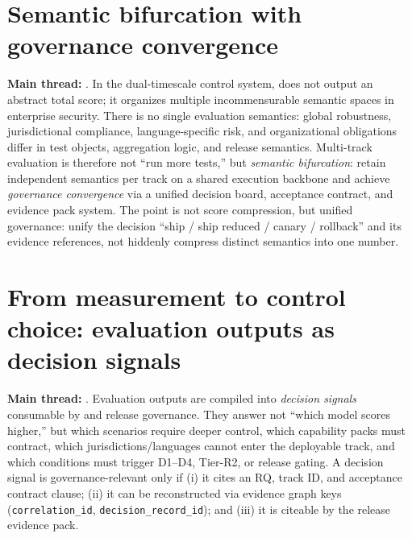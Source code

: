 \documentclass[11pt,a4paper]{report}
\begin{document}
\section{Semantic bifurcation with governance convergence}
\textbf{Main thread:} \EvalFramework{}. In the dual-timescale control system, \EvalFramework{} does not output an abstract total score; it organizes multiple incommensurable semantic spaces in enterprise security. There is no single evaluation semantics: global robustness, jurisdictional compliance, language-specific risk, and organizational obligations differ in test objects, aggregation logic, and release semantics. Multi-track evaluation is therefore not “run more tests,” but \emph{semantic bifurcation}: retain independent semantics per track on a shared execution backbone and achieve \emph{governance convergence} via a unified decision board, acceptance contract, and evidence pack system. The point is not score compression, but unified governance: unify the decision “ship / ship reduced / canary / rollback” and its evidence references, not hiddenly compress distinct semantics into one number.

\section{From measurement to control choice: evaluation outputs as decision signals}
\textbf{Main thread:} \EvalFramework{}. Evaluation outputs are compiled into \emph{decision signals} consumable by \ControlPlane{} and release governance. They answer not “which model scores higher,” but which scenarios require deeper control, which capability packs must contract, which jurisdictions/languages cannot enter the deployable track, and which conditions must trigger D1--D4, Tier-R2, or release gating. A decision signal is governance-relevant only if (i) it cites an RQ, track ID, and acceptance contract clause; (ii) it can be reconstructed via evidence graph keys (\texttt{correlation\_id}, \texttt{decision\_record\_id}); and (iii) it is citeable by the release evidence pack.
\end{document}
